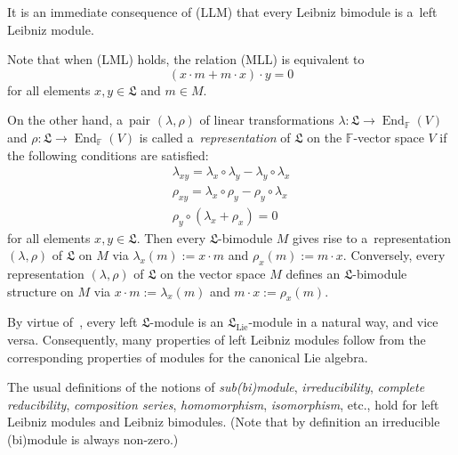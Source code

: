 \documentclass{jonasart}
\DeclareMathOperator{\End}{End}
\DeclareMathOperator{\lie}{Lie}
\newcommand{\fbb}{\mathbb{F}}
\newcommand{\lf}{\mathfrak{L}}
\begin{document}
	It is an immediate consequence of (LLM) that every Leibniz bimodule is a~left Leibniz module.
	\begin{remark}\label{ZD}
		{Note that when (LML) holds, the relation (MLL) is equivalent to
		\begin{equation}
			\tag{ZD}
            (x\cdot m+m\cdot x)\cdot y=0
		\end{equation}
		for all elements $x,y\in\lf$ and $m\in M$.}
	\end{remark}
	On the other hand, a~pair $(\lambda,\rho)$ of linear transformations $\lambda:\lf\to
	\End_\fbb(V)$ and $\rho:\lf\to\End_\fbb(V)$ is called a~\emph{representation\/} of $\lf$
	on the $\fbb$-vector space $V$ if the following conditions are satisfied:
	\begin{gather}
		\lambda_{xy}=\lambda_x\circ\lambda_y -\lambda_y\circ\lambda_x \label{LLMrep} \\
		\rho_{xy}=\lambda_x\circ\rho_y -\rho_y\circ\lambda_x \label{LMLrep} \\
		\rho_y\circ(\lambda_x +\rho_x )=0 \label{MLLrep}
	\end{gather}
	for all elements $x,y\in\lf$. Then every $\lf$-bimodule $M$ gives rise to a~representation
	$(\lambda,\rho)$ of $\lf$ on $M$ via $\lambda_x (m):=x\cdot m$ and $\rho_x (m):=m\cdot x$. Conversely, every representation $(\lambda,\rho)$ of $\lf$ on the vector space $M$
	defines an $\lf$-bimodule structure on $M$ via $x\cdot m:=\lambda_x (m)$ and $m\cdot x:=\rho_x (m)$.

	By virtue of~\cite[Lemma 3.3]{F1}, every left $\lf$-module is an $\lf_{\lie}$-module in a natural way, and vice versa. Consequently, many properties of left Leibniz modules follow from the corresponding properties of modules for the canonical Lie algebra.

	The usual definitions of the notions of \emph{sub\textrm{(}bi\textrm{)}module\/},
	\emph{irreducibility\/}, \emph{complete reducibility\/}, \emph{composition series\/},
	\emph{homomorphism\/}, \emph{isomorphism\/}, etc., hold for left Leibniz modules and Leibniz bimodules. (Note that by definition an irreducible (bi)module is always non-zero.)
\end{document}
